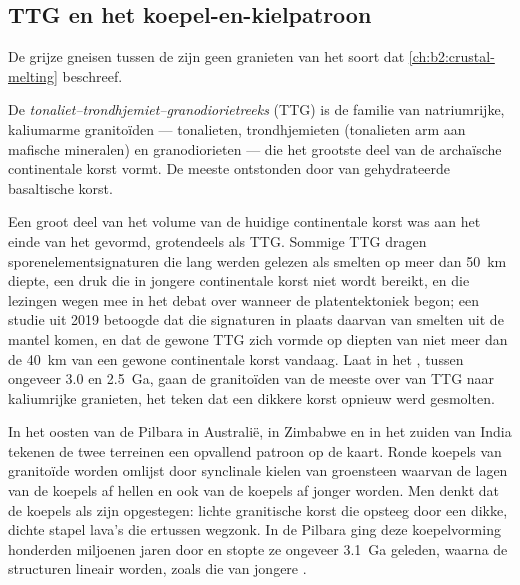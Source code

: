 \subsection*{TTG en het koepel-en-kielpatroon}

De grijze gneisen tussen de  zijn geen granieten van het soort dat
\cref{ch:b2:crustal-melting} beschreef.

\begin{definition}\label{def:b2:precambrian-earth:ttg}
De \emph{tonaliet--trondhjemiet--granodiorietreeks}
(TTG) is de familie van natriumrijke, kaliumarme granitoïden --- tonalieten,
trondhjemieten (tonalieten arm aan mafische mineralen) en granodiorieten --- die het grootste deel van
de archaïsche continentale korst vormt. De meeste ontstonden door  van gehydrateerde basaltische
korst.
\end{definition}

Een groot deel van het volume van de huidige continentale korst was aan het einde van het  gevormd, grotendeels
als TTG. Sommige TTG dragen sporenelementsignaturen die lang werden gelezen als smelten op meer dan
\qty{50}{km} diepte, een druk die in jongere continentale korst niet wordt bereikt, en die lezingen
wegen mee in het debat over wanneer de platentektoniek begon; een studie uit 2019 betoogde dat die signaturen
in plaats daarvan van smelten uit de mantel komen, en dat de gewone TTG zich vormde op
diepten van niet meer dan de \qty{40}{km} van een gewone continentale korst vandaag. Laat in het
, tussen ongeveer 3.0 en \qty{2.5}{Ga}, gaan de granitoïden van de meeste  over van TTG
naar kaliumrijke granieten, het teken dat een dikkere korst opnieuw werd gesmolten.

In het oosten van de Pilbara in Australië, in Zimbabwe en in het zuiden van India tekenen de twee terreinen een
opvallend patroon op de kaart. Ronde koepels van granitoïde worden omlijst door synclinale kielen van groensteen waarvan de lagen van de koepels af hellen en ook van de koepels af jonger worden. Men
denkt dat de koepels als  zijn opgestegen: lichte granitische korst die opsteeg door een dikke, dichte stapel
lava's die ertussen wegzonk. In de Pilbara ging deze koepelvorming honderden miljoenen
jaren door en stopte ze ongeveer \qty{3.1}{Ga} geleden, waarna de structuren lineair worden, zoals die
van jongere .

